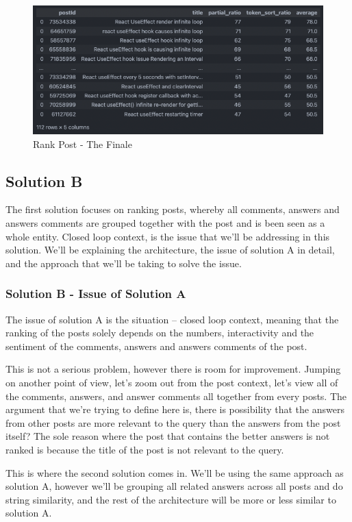 \begin{figure}[H]
  \noindent \includegraphics[scale=0.55]{assets/fuzzy-wuzzy-query-1-results.png}
\caption{Rank Post - The Finale }\label{finale_results_solution_a}
\end{figure}

\pagebreak
\subsection{Solution B}
The first solution focuses on ranking posts, whereby all comments, answers and answers comments are grouped together with the post and is been seen as a whole entity. Closed loop context, is the issue that we'll be addressing in this solution. We'll be explaining the architecture, the issue of solution A in detail, and the approach that we'll be taking to solve the issue.

\subsubsection{Solution B - Issue of Solution A}
The issue of solution A is the situation -- closed loop context, meaning that the ranking of the posts solely depends on the numbers, interactivity and the sentiment of the comments, answers and answers comments of the post. 

This is not a serious problem, however there is room for improvement. Jumping on another point of view, let's zoom out from the post context, let's view all of the comments, answers, and answer comments all together from every posts. The argument that we're trying to define here is, there is possibility that the answers from other posts are more relevant to the query than the answers from the post itself? The sole reason where the post that contains the better answers is not ranked is because the title of the post is not relevant to the query.

This is where the second solution comes in. We'll be using the same approach as solution A, however we'll be grouping all related answers across all posts and do string similarity, and the rest of the architecture will be more or less similar to solution A. 

